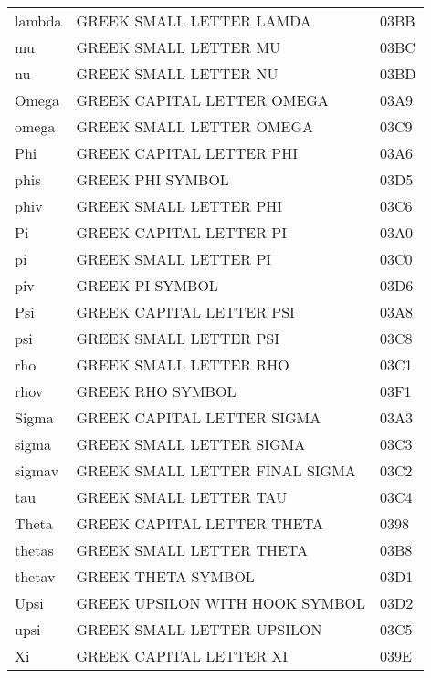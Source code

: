 \begin{longtable}{lll}
lambda             & GREEK SMALL LETTER LAMDA            & 03BB\\
mu                 & GREEK SMALL LETTER MU               & 03BC\\
nu                 & GREEK SMALL LETTER NU               & 03BD\\
Omega              & GREEK CAPITAL LETTER OMEGA          & 03A9\\
omega              & GREEK SMALL LETTER OMEGA            & 03C9\\
Phi                & GREEK CAPITAL LETTER PHI            & 03A6\\
phis               & GREEK PHI SYMBOL                    & 03D5\\
phiv               & GREEK SMALL LETTER PHI              & 03C6\\
Pi                 & GREEK CAPITAL LETTER PI             & 03A0\\
pi                 & GREEK SMALL LETTER PI               & 03C0\\
piv                & GREEK PI SYMBOL                     & 03D6\\
Psi                & GREEK CAPITAL LETTER PSI            & 03A8\\
psi                & GREEK SMALL LETTER PSI              & 03C8\\
rho                & GREEK SMALL LETTER RHO              & 03C1\\
rhov               & GREEK RHO SYMBOL                    & 03F1\\
Sigma              & GREEK CAPITAL LETTER SIGMA          & 03A3\\
sigma              & GREEK SMALL LETTER SIGMA            & 03C3\\
sigmav             & GREEK SMALL LETTER FINAL SIGMA      & 03C2\\
tau                & GREEK SMALL LETTER TAU              & 03C4\\
Theta              & GREEK CAPITAL LETTER THETA          & 0398\\
thetas             & GREEK SMALL LETTER THETA            & 03B8\\
thetav             & GREEK THETA SYMBOL                  & 03D1\\
Upsi               & GREEK UPSILON WITH HOOK SYMBOL      & 03D2\\
upsi               & GREEK SMALL LETTER UPSILON          & 03C5\\
Xi                 & GREEK CAPITAL LETTER XI             & 039E\\

\end{longtable}
